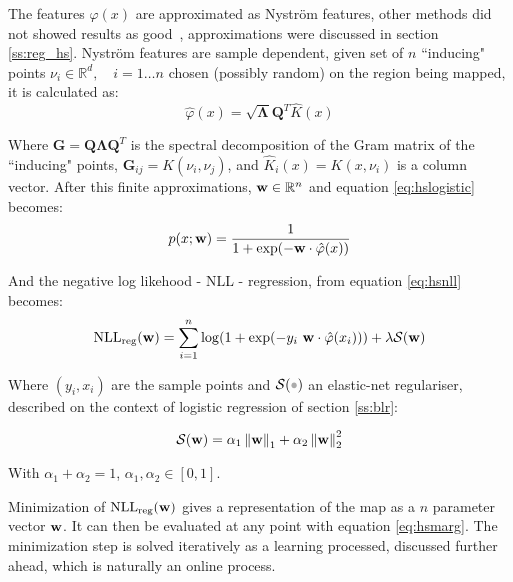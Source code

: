 The features $\varphi(x)$ are approximated as Nystr\"om features, other
methods did not showed results as good~\cite{ramos2016hilbert}, approximations
were discussed in section \ref{ss:reg_hs}. Nystr\"om features are sample
dependent, given set of $n$ ``inducing" points $\nu_i\in\mathbb{R}^d, \quad
i=1\ldots n$ chosen (possibly random) on the region being mapped, it is
calculated as:
\begin{equation}
\label{eq:nystrom}
\hat\varphi(x) = \sqrt{\mathbf{\Lambda}}\mathbf{Q}^T\hat K(x)
\end{equation}
 
 Where $\mathbf{G}=\mathbf{Q}\mathbf{\Lambda}\mathbf{Q}^T$ is the
 spectral decomposition of the Gram matrix of the ``inducing" points,
 $\mathbf{G}_{ij}=K(\nu_i,\nu_j)$, and ${\displaystyle\hat K}_i(x) = K(x,\nu_i)$
 is a column vector. After this finite approximations,
 $\mathrm{\mathbf{w}}\in\mathbb{R}^n$ and equation \ref{eq:hslogistic} becomes:
\begin{equation}
\label{eq:hsmarg}
p(x;\mathrm{\mathbf{w}}) = \frac{1}{1+\exp(-\mathrm{\mathbf{w}}\cdot \hat\varphi(x))}
\end{equation}
 
 And the negative log likehood - NLL - regression, from equation \ref{eq:hsnll}
 becomes:
\begin{equation}
\label{eq:finitenll}
\text{NLL}_{\text{reg}}(\mathrm{\mathbf{w}}) =  \sum_{i=1}^n \log(1+\exp(-y_i~
\mathrm{\mathbf{w}}\cdot\hat\varphi(x_i))) +\lambda\mathcal{S}(\mathrm{\mathbf{w}})
\end{equation}
 
 Where $(y_i,x_i)$ are the sample points and $\mathcal{S}(\parm)$ an
 elastic-net regulariser, described on the context of logistic regression of section \ref{ss:blr}:
  
\begin{equation}
\label{eq:elasticnet}
\mathcal{S}(\mathrm{\mathbf{w}})=\alpha_1\left\lVert\mathrm{\mathbf{w}}\right\rVert_1 + \alpha_2\left\lVert\mathrm{\mathbf{w}}\right\rVert_2^2
\end{equation}

With $\alpha_1+\alpha_2=1$, $\alpha_1,\alpha_2\in[0,1]$.

Minimization of $\text{NLL}_{\text{reg}}(\mathrm{\mathbf{w}})$ gives a representation of
the map as a $n$ parameter vector $\mathrm{\mathbf{w}}$. It can then be evaluated at any
point with equation \ref{eq:hsmarg}. The minimization step is solved iteratively
as a learning processed, discussed further ahead, which is naturally an online
process.
 
 
